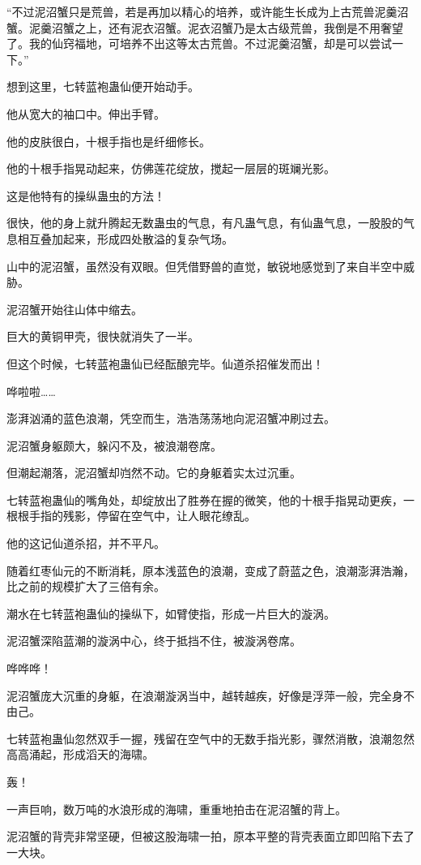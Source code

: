 \begin{this_body}
“不过泥沼蟹只是荒兽，若是再加以精心的培养，或许能生长成为上古荒兽泥羹沼蟹。泥羹沼蟹之上，还有泥衣沼蟹。泥衣沼蟹乃是太古级荒兽，我倒是不用奢望了。我的仙窍福地，可培养不出这等太古荒兽。不过泥羹沼蟹，却是可以尝试一下。”

想到这里，七转蓝袍蛊仙便开始动手。

他从宽大的袖口中。伸出手臂。

他的皮肤很白，十根手指也是纤细修长。

他的十根手指晃动起来，仿佛莲花绽放，搅起一层层的斑斓光影。

这是他特有的操纵蛊虫的方法！

很快，他的身上就升腾起无数蛊虫的气息，有凡蛊气息，有仙蛊气息，一股股的气息相互叠加起来，形成四处散溢的复杂气场。

山中的泥沼蟹，虽然没有双眼。但凭借野兽的直觉，敏锐地感觉到了来自半空中威胁。

泥沼蟹开始往山体中缩去。

巨大的黄铜甲壳，很快就消失了一半。

但这个时候，七转蓝袍蛊仙已经酝酿完毕。仙道杀招催发而出！

哗啦啦……

澎湃汹涌的蓝色浪潮，凭空而生，浩浩荡荡地向泥沼蟹冲刷过去。

泥沼蟹身躯颇大，躲闪不及，被浪潮卷席。

但潮起潮落，泥沼蟹却岿然不动。它的身躯着实太过沉重。

七转蓝袍蛊仙的嘴角处，却绽放出了胜券在握的微笑，他的十根手指晃动更疾，一根根手指的残影，停留在空气中，让人眼花缭乱。

他的这记仙道杀招，并不平凡。

随着红枣仙元的不断消耗，原本浅蓝色的浪潮，变成了蔚蓝之色，浪潮澎湃浩瀚，比之前的规模扩大了三倍有余。

潮水在七转蓝袍蛊仙的操纵下，如臂使指，形成一片巨大的漩涡。

泥沼蟹深陷蓝潮的漩涡中心，终于抵挡不住，被漩涡卷席。

哗哗哗！

泥沼蟹庞大沉重的身躯，在浪潮漩涡当中，越转越疾，好像是浮萍一般，完全身不由己。

七转蓝袍蛊仙忽然双手一握，残留在空气中的无数手指光影，骤然消散，浪潮忽然高高涌起，形成滔天的海啸。

轰！

一声巨响，数万吨的水浪形成的海啸，重重地拍击在泥沼蟹的背上。

泥沼蟹的背壳非常坚硬，但被这股海啸一拍，原本平整的背壳表面立即凹陷下去了一大块。


\end{this_body}
